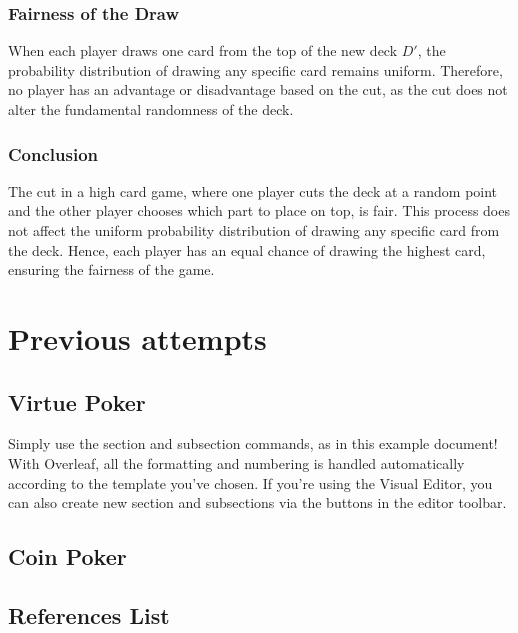 \documentclass{article}
\begin{document}
\subsubsection*{Fairness of the Draw}

When each player draws one card from the top of the new deck \( D' \), the probability distribution of drawing any specific card remains uniform. Therefore, no player has an advantage or disadvantage based on the cut, as the cut does not alter the fundamental randomness of the deck.

\subsubsection*{Conclusion}

The cut in a high card game, where one player cuts the deck at a random point and the other player chooses which part to place on top, is fair. This process does not affect the uniform probability distribution of drawing any specific card from the deck. Hence, each player has an equal chance of drawing the highest card, ensuring the fairness of the game.

\section{Previous attempts}

\subsection{Virtue Poker}

Simply use the section and subsection commands, as in this example document! With Overleaf, all the formatting and numbering is handled automatically according to the template you've chosen. If you're using the Visual Editor, you can also create new section and subsections via the buttons in the editor toolbar.

\subsection{Coin Poker}

\subsection{References List}




\end{document}
